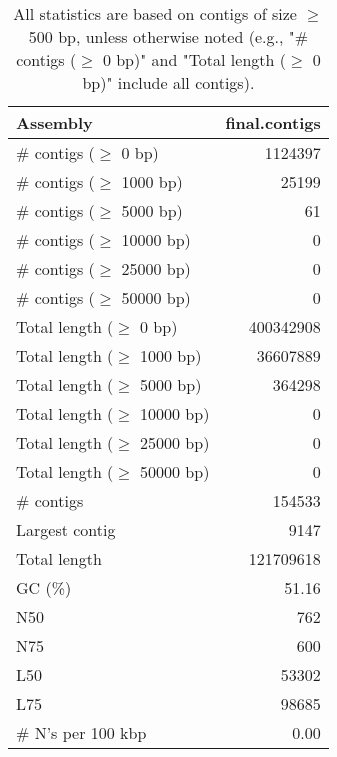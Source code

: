 \documentclass[12pt,a4paper]{article}
\begin{document}
\begin{table}[ht]
\begin{center}
\caption{All statistics are based on contigs of size $\geq$ 500 bp, unless otherwise noted (e.g., "\# contigs ($\geq$ 0 bp)" and "Total length ($\geq$ 0 bp)" include all contigs).}
\begin{tabular}{|l*{1}{|r}|}
\hline
Assembly & final.contigs \\ \hline
\# contigs ($\geq$ 0 bp) & 1124397 \\ \hline
\# contigs ($\geq$ 1000 bp) & 25199 \\ \hline
\# contigs ($\geq$ 5000 bp) & 61 \\ \hline
\# contigs ($\geq$ 10000 bp) & 0 \\ \hline
\# contigs ($\geq$ 25000 bp) & 0 \\ \hline
\# contigs ($\geq$ 50000 bp) & 0 \\ \hline
Total length ($\geq$ 0 bp) & 400342908 \\ \hline
Total length ($\geq$ 1000 bp) & 36607889 \\ \hline
Total length ($\geq$ 5000 bp) & 364298 \\ \hline
Total length ($\geq$ 10000 bp) & 0 \\ \hline
Total length ($\geq$ 25000 bp) & 0 \\ \hline
Total length ($\geq$ 50000 bp) & 0 \\ \hline
\# contigs & 154533 \\ \hline
Largest contig & 9147 \\ \hline
Total length & 121709618 \\ \hline
GC (\%) & 51.16 \\ \hline
N50 & 762 \\ \hline
N75 & 600 \\ \hline
L50 & 53302 \\ \hline
L75 & 98685 \\ \hline
\# N's per 100 kbp & 0.00 \\ \hline
\end{tabular}
\end{center}
\end{table}
\end{document}
